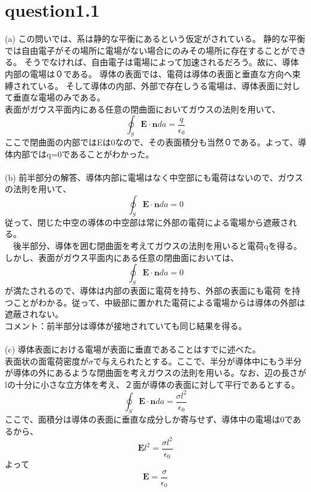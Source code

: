 \documentclass{article}
\begin{document}
\section  {question1.1}
(a) この問いでは、系は静的な平衡にあるという仮定がされている。
静的な平衡では自由電子がその場所に電場がない場合にのみその場所に存在することができる。
そうでなければ、自由電子は電場によって加速されるだろう。故に、導体内部の電場は０である。
導体の表面では、電荷は導体の表面と垂直な方向へ束縛されている。
そして導体の内部、外部で存在しうる電場は、導体表面に対して垂直な電場のみである。
\\
表面がガウス平面内にある任意の閉曲面においてガウスの法則を用いて、
\[
  \oint_S \mathbf{E} \cdot \mathbf{n} da = \frac{q}{\epsilon_0}
\]
ここで閉曲面の内部ではEは0なので、その表面積分も当然０である。よって、導体内部ではq=0であることがわかった。\\\\
(b) 前半部分の解答、導体内部に電場はなく中空部にも電荷はないので、ガウスの法則を用いて、
\[
  \oint_S \mathbf{E} \cdot \mathbf{n} da = 0
\]
従って、閉じた中空の導体の中空部は常に外部の電荷による電場から遮蔽される。
\\
　後半部分、導体を囲む閉曲面を考えてガウスの法則を用いると電荷qを得る。しかし、表面がガウス平面内にある任意の閉曲面においては、
\[
  \oint_S \mathbf{E} \cdot \mathbf{n} da = 0
\]
が満たされるので、導体は内部の表面に電荷を持ち、外部の表面にも電荷
を持つことがわかる。従って、中級部に置かれた電荷による電場からは導体の外部は遮蔽されない。
\\
コメント：前半部分は導体が接地されていても同じ結果を得る。
\\
\\
(c) 導体表面における電場が表面に垂直であることはすでに述べた。\\
表面状の面電荷密度が$\sigma$で与えられたとする。ここで、半分が導体中にもう半分が導体の外にあるような閉曲面を考えガウスの法則を用いる。なお、辺の長さがlの十分に小さな立方体を考え、２面が導体の表面に対して平行であるとする。
\[
  \oint_S \mathbf{E} \cdot \mathbf{n} da = \frac{ \sigma l^2 }{\epsilon_0}
\]
ここで、面積分は導体の表面に垂直な成分しか寄与せず、導体中の電場は0であるから、
\[
  \mathbf{E} l^2 = \frac{ \sigma l^2 }{\epsilon_0}
\]
よって\[
  \mathbf{E} = \frac{ \sigma}{\epsilon_0}
\]
\newpage
\end{document}
